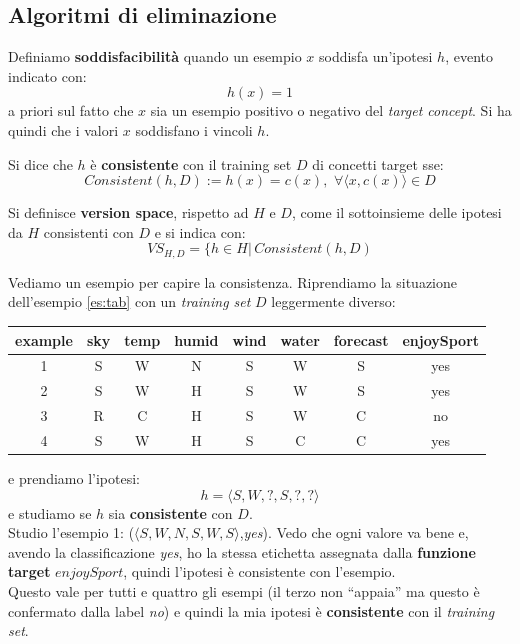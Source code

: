 \documentclass[a4paper,12pt, oneside]{book}
\begin{document}
\subsection{Algoritmi di eliminazione}
\begin{definizione}
  Definiamo \textbf{soddisfacibilità} quando un esempio $x$ soddisfa un'ipotesi
  $h$, evento indicato con:
  \[h(x)=1\]
  a priori sul fatto che $x$ sia un esempio positivo o negativo del
  \textit{target concept}. Si ha quindi
  che i valori $x$ soddisfano i vincoli $h$. 
\end{definizione}
\begin{definizione}
  Si dice che $h$ è \textbf{consistente} con il training set $D$ di concetti
  target sse: 
  \[Consistent(h,D):=h(x)=c(x),\,\,\forall \langle x,c(x)\rangle\in D\]
\end{definizione}
\begin{definizione}
  Si definisce \textbf{version space}, rispetto ad $H$ e $D$, come il
  sottoinsieme delle ipotesi da $H$ consistenti con $D$ e si indica con:
  \[VS_{H,D}=\{h\in H|\,Consistent(h,D)\]
\end{definizione}
\begin{esempio}
  Vediamo un esempio per capire la consistenza. Riprendiamo la situazione
  dell'esempio \ref{es:tab} con un \textit{training set} $D$ leggermente
  diverso: 
  \begin{table}[H]
    \centering
    \begin{tabular}[H]{|c|c|c|c|c|c|c|c|}
      \hline
      \textbf{example} & \textbf{sky} & \textbf{temp} & \textbf{humid}
      & \textbf{wind} & \textbf{water} & \textbf{forecast} &
      \textbf{enjoySport}\\
      \hline
      1 & S & W & N & S & W & S & \color{darkgreen} yes\\
      2 & S & W & H & S & W & S & \color{darkgreen} yes\\
      3 & R & C & H & S & W & C & \color{red} no\\
      4 & S & W & H & S & C & C & \color{darkgreen} yes\\
      \hline
    \end{tabular}
  \end{table}
  e prendiamo l'ipotesi:
  \[h=\langle S,W, ?, S, ?, ?\rangle\]
  e studiamo se $h$ sia \textbf{consistente} con $D$.\\
  Studio l'esempio 1: ($\langle S,W, N, S, W, S\rangle$,\textit{yes}). Vedo che
  ogni valore va bene e, avendo la classificazione 
  \textit{yes}, ho la stessa etichetta assegnata dalla \textbf{funzione target}
  $enjoySport$, quindi l'ipotesi è consistente con l'esempio. \\
  Questo vale per tutti e quattro gli esempi (il terzo non ``appaia'' ma questo
  è confermato dalla label \textit{no}) e quindi la mia ipotesi è
  \textbf{consistente} con il \textit{training set}.
\end{esempio}
\end{document}
